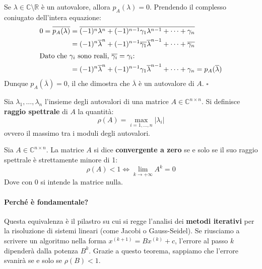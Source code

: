 \documentclass[a4paper,12pt]{article}
\begin{document}
	\medskip
	\noindent Se $\lambda \in \mathbb{C} \setminus \mathbb{R}$ è un autovalore, allora $p_A(\lambda) = 0$. Prendendo il complesso coniugato dell'intera equazione:
	\begin{align*}
		0 = \overline{p_A(\lambda)} &= \overline{(-1)^n \lambda^n + (-1)^{n-1} \gamma_1 \lambda^{n-1} + \dots + \gamma_n} \\
		&= (-1)^n \overline{\lambda}^n + (-1)^{n-1} \overline{\gamma_1} \overline{\lambda}^{n-1} + \dots + \overline{\gamma_n} \\
		\intertext{Dato che $\gamma_i$ sono reali, $\overline{\gamma_i} = \gamma_i$:}
		&= (-1)^n \overline{\lambda}^n + (-1)^{n-1} \gamma_1 \overline{\lambda}^{n-1} + \dots + \gamma_n = p_A(\overline{\lambda})
	\end{align*}
	Dunque $p_A(\overline{\lambda}) = 0$, il che dimostra che $\overline{\lambda}$ è un autovalore di $A$. $\square$
	
	\vspace{0.8cm}
	
	\begin{tcolorbox}[title=Definizione: Raggio Spettrale, colback=red!5!white, colframe=red!75!black]
		Sia $\lambda_1, \dots, \lambda_n$ l'insieme degli autovalori di una matrice $A \in \mathbb{C}^{n \times n}$. Si definisce \textbf{raggio spettrale} di $A$ la quantità:
		\begin{equation}
			\rho(A) = \max_{i=1, \dots, n} |\lambda_i|
		\end{equation}
		ovvero il massimo tra i moduli degli autovalori.
	\end{tcolorbox}
	\begin{tcolorbox}[title=Proprietà: Convergenza delle Matrici]
		Sia $A \in \mathbb{C}^{n \times n}$. La matrice $A$ si dice \textbf{convergente a zero} se e solo se il suo raggio spettrale è strettamente minore di 1:
		\begin{equation}
			\rho(A) < 1 \iff \lim_{k \to +\infty} A^k = 0
		\end{equation}
		Dove con $0$ si intende la matrice nulla.
	\end{tcolorbox}
	
	\paragraph{Perché è fondamentale?}
	Questa equivalenza è il pilastro su cui si regge l'analisi dei \textbf{metodi iterativi} per la risoluzione di sistemi lineari (come Jacobi o Gauss-Seidel). Se riusciamo a scrivere un algoritmo nella forma $x^{(k+1)} = B x^{(k)} + c$, l'errore al passo $k$ dipenderà dalla potenza $B^k$. Grazie a questo teorema, sappiamo che l'errore svanirà se e solo se $\rho(B) < 1$.
	
\end{document}
